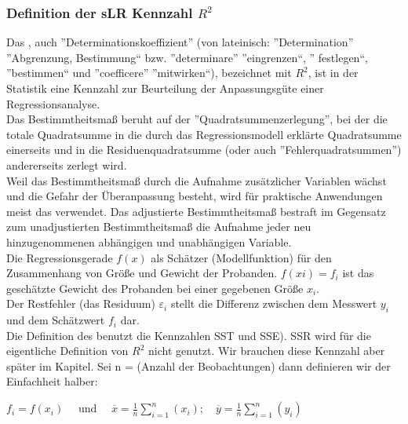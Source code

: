 \documentclass[12pt]{article}
\begin{document}
\subsubsection{Definition der sLR Kennzahl $ R^2 $}
%
Das {\color{blue}{Bestimmtheitsmaß $R^2$}} , auch ”Determinationskoeffizient” (von lateinisch: ”Determination”
”Abgrenzung, Bestimmung“ bzw. ”determinare” ”eingrenzen“, ” festlegen“, ”bestimmen“ und ”coefficere” ”mitwirken“), bezeichnet mit $R^2$, ist in der Statistik eine Kennzahl zur Beurteilung der Anpassungsgüte einer Regressionsanalyse.\\
Das Bestimmtheitsmaß beruht auf der ”Quadratsummenzerlegung”, bei der die totale
Quadratsumme in die durch das Regressionsmodell erklärte Quadratsumme einerseits
und in die Residuenquadratsumme (oder auch ”Fehlerquadratsummen”) andererseits
zerlegt wird.\\[0.2cm]
Weil das Bestimmtheitsmaß durch die Aufnahme zusätzlicher Variablen wächst und
die Gefahr der Überanpassung besteht, wird für praktische Anwendungen meist das
{\color{blue}{adjustierte Bestimmtheitsmaß $Adj.R^2$}}  verwendet. Das adjustierte Bestimmtheitsmaß bestraft im Gegensatz zum unadjustierten Bestimmtheitsmaß die Aufnahme jeder neu hinzugenommenen abhängigen und unabhängigen Variable.\\[0.2cm]
Die Regressionsgerade $f(x)$ als Schätzer (Modellfunktion) für den Zusammenhang von
Größe und Gewicht der Probanden. $f(xi) = f_i $  ist das geschätzte Gewicht des
Probanden bei einer gegebenen Größe $x_i$.\\[0.2cm]
Der Restfehler (das Residuum) $\varepsilon_i$ stellt die Differenz zwischen dem Messwert $y_i$ und dem Schätzwert $f_i$ dar.\\[0.2cm]
%
Die Definition des {\color{blue}{Bestimmtheitsmaß $R^2$}}  benutzt die Kennzahlen SST und SSE). SSR wird für die eigentliche Definition von $R^2$ nicht genutzt. Wir brauchen diese Kennzahl aber später im Kapitel. Sei n = (Anzahl der Beobachtungen) dann definieren wir der Einfachheit halber: 
\begin{center}
$ f_i = f(x_i)\quad $ und $ \quad \overline{x} = \frac{1}{n} \sum\limits_{i=1}^n (x_i) ; \quad \overline{y} = \frac{1}{n} \sum\limits_{i=1}^n (y_i) $\\
\end{center} 
\end{document}
